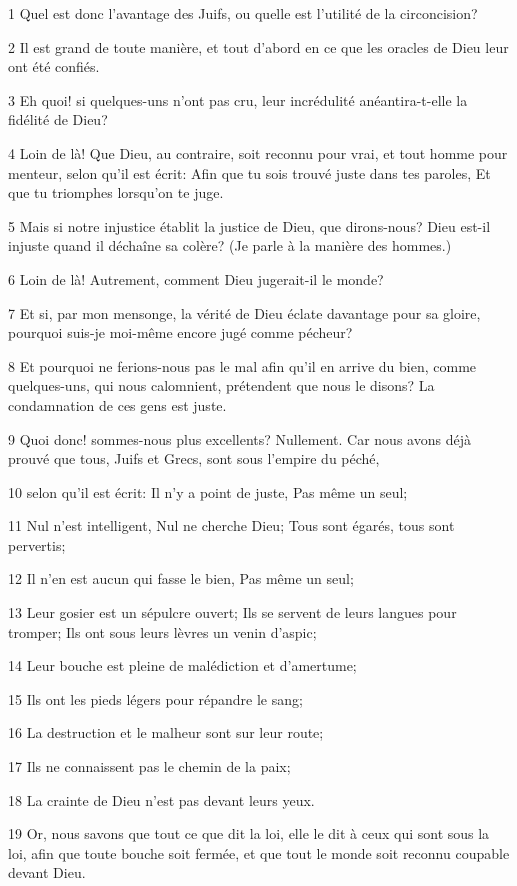 \par 1 Quel est donc l'avantage des Juifs, ou quelle est l'utilité de la circoncision?
\par 2 Il est grand de toute manière, et tout d'abord en ce que les oracles de Dieu leur ont été confiés.
\par 3 Eh quoi! si quelques-uns n'ont pas cru, leur incrédulité anéantira-t-elle la fidélité de Dieu?
\par 4 Loin de là! Que Dieu, au contraire, soit reconnu pour vrai, et tout homme pour menteur, selon qu'il est écrit: Afin que tu sois trouvé juste dans tes paroles, Et que tu triomphes lorsqu'on te juge.
\par 5 Mais si notre injustice établit la justice de Dieu, que dirons-nous? Dieu est-il injuste quand il déchaîne sa colère? (Je parle à la manière des hommes.)
\par 6 Loin de là! Autrement, comment Dieu jugerait-il le monde?
\par 7 Et si, par mon mensonge, la vérité de Dieu éclate davantage pour sa gloire, pourquoi suis-je moi-même encore jugé comme pécheur?
\par 8 Et pourquoi ne ferions-nous pas le mal afin qu'il en arrive du bien, comme quelques-uns, qui nous calomnient, prétendent que nous le disons? La condamnation de ces gens est juste.
\par 9 Quoi donc! sommes-nous plus excellents? Nullement. Car nous avons déjà prouvé que tous, Juifs et Grecs, sont sous l'empire du péché,
\par 10 selon qu'il est écrit: Il n'y a point de juste, Pas même un seul;
\par 11 Nul n'est intelligent, Nul ne cherche Dieu; Tous sont égarés, tous sont pervertis;
\par 12 Il n'en est aucun qui fasse le bien, Pas même un seul;
\par 13 Leur gosier est un sépulcre ouvert; Ils se servent de leurs langues pour tromper; Ils ont sous leurs lèvres un venin d'aspic;
\par 14 Leur bouche est pleine de malédiction et d'amertume;
\par 15 Ils ont les pieds légers pour répandre le sang;
\par 16 La destruction et le malheur sont sur leur route;
\par 17 Ils ne connaissent pas le chemin de la paix;
\par 18 La crainte de Dieu n'est pas devant leurs yeux.
\par 19 Or, nous savons que tout ce que dit la loi, elle le dit à ceux qui sont sous la loi, afin que toute bouche soit fermée, et que tout le monde soit reconnu coupable devant Dieu.
